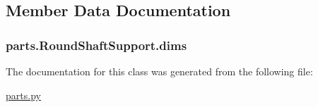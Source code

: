 \subsection{Member Data Documentation}
\hypertarget{classparts_1_1_round_shaft_support_ace8862690471a8674b3ea4765a731865}{}
\subsubsection[{dims}]{\setlength{\rightskip}{0pt plus 5cm}parts.\+Round\+Shaft\+Support.\+dims}\label{classparts_1_1_round_shaft_support_ace8862690471a8674b3ea4765a731865}


The documentation for this class was generated from the following file\+:\begin{DoxyCompactItemize}
\item 
\hyperlink{parts_8py}{parts.\+py}\end{DoxyCompactItemize}

